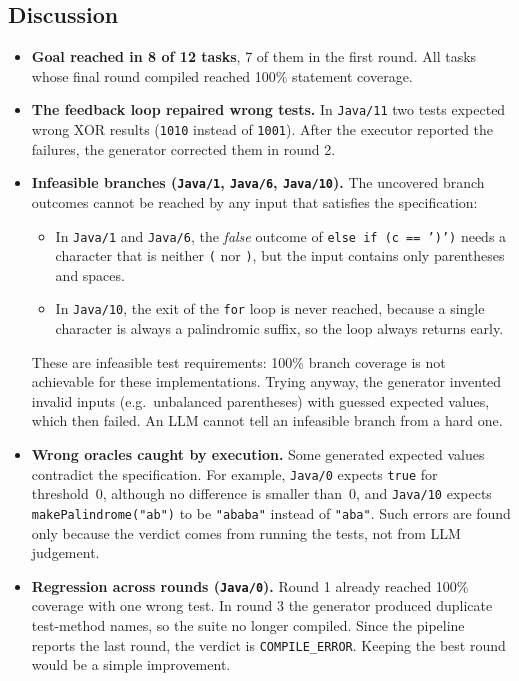 \documentclass[11pt,a4paper]{article}
\begin{document}
\subsection{Discussion}
\begin{itemize}
  \item \textbf{Goal reached in 8 of 12 tasks}, 7 of them in the first round. All tasks whose final round compiled reached 100\% statement coverage.
  \item \textbf{The feedback loop repaired wrong tests.} In \texttt{Java/11} two tests expected wrong XOR results (\texttt{1010} instead of \texttt{1001}). After the executor reported the failures, the generator corrected them in round 2.
  \item \textbf{Infeasible branches (\texttt{Java/1}, \texttt{Java/6}, \texttt{Java/10}).} The uncovered branch outcomes cannot be reached by any input that satisfies the specification:
  \begin{itemize}
    \item In \texttt{Java/1} and \texttt{Java/6}, the \emph{false} outcome of \texttt{else if (c == ')')} needs a character that is neither \texttt{(} nor \texttt{)}, but the input contains only parentheses and spaces.
    \item In \texttt{Java/10}, the exit of the \texttt{for} loop is never reached, because a single character is always a palindromic suffix, so the loop always returns early.
  \end{itemize}
  These are infeasible test requirements: 100\% branch coverage is not achievable for these implementations. Trying anyway, the generator invented invalid inputs (e.g.\ unbalanced parentheses) with guessed expected values, which then failed. An LLM cannot tell an infeasible branch from a hard one.
  \item \textbf{Wrong oracles caught by execution.} Some generated expected values contradict the specification. For example, \texttt{Java/0} expects \texttt{true} for threshold~0, although no difference is smaller than~0, and \texttt{Java/10} expects \texttt{makePalindrome("ab")} to be \texttt{"ababa"} instead of \texttt{"aba"}. Such errors are found only because the verdict comes from running the tests, not from LLM judgement.
  \item \textbf{Regression across rounds (\texttt{Java/0}).} Round 1 already reached 100\% coverage with one wrong test. In round 3 the generator produced duplicate test-method names, so the suite no longer compiled. Since the pipeline reports the last round, the verdict is \texttt{COMPILE\_ERROR}. Keeping the best round would be a simple improvement.
\end{itemize}
\end{document}
